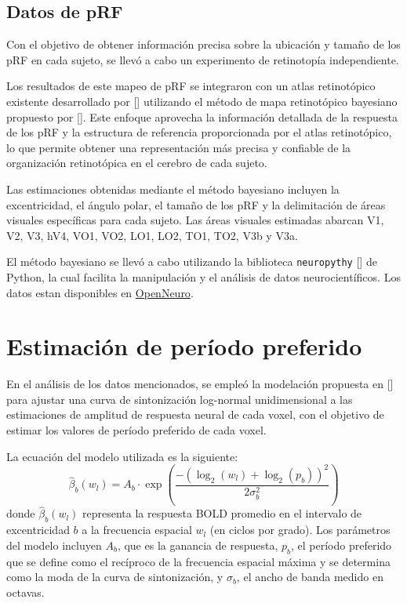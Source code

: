 \subsection{Datos de pRF}

Con el objetivo de obtener información precisa sobre la ubicación y tamaño de los pRF en cada sujeto, se llevó a cabo un experimento de retinotopía independiente. 

Los resultados de este mapeo de pRF se integraron con un atlas retinotópico existente desarrollado por [\cite{benson_retinotopic_2012}] utilizando el método de mapa retinotópico bayesiano propuesto por [\cite{benson_human_2018}]. Este enfoque aprovecha la información detallada de la respuesta de los pRF y la estructura de referencia proporcionada por el atlas retinotópico, lo que permite obtener una representación más precisa y confiable de la organización retinotópica en el cerebro de cada sujeto.

Las estimaciones obtenidas mediante el método bayesiano incluyen la excentricidad, el ángulo polar, el tamaño de los pRF y la delimitación de áreas visuales específicas para cada sujeto. Las áreas visuales estimadas abarcan V1, V2, V3, hV4, VO1, VO2, LO1, LO2, TO1, TO2, V3b y V3a.

El método bayesiano se llevó a cabo utilizando la biblioteca \texttt{neuropythy} [\cite{benson_human_2018}] de Python, la cual facilita la manipulación y el análisis de datos neurocientíficos. Los datos estan disponibles en \href{https://openneuro.org/datasets/ds003812/versions/1.1.0}{OpenNeuro}.


\section{Estimaci\'on de per\'iodo preferido}

En el análisis de los datos mencionados, se empleó la modelación propuesta en [\cite{broderick_mapping_2022}] para ajustar una curva de sintonización log-normal unidimensional a las estimaciones de amplitud de respuesta neural de cada voxel, con el objetivo de estimar los valores de período preferido de cada voxel.

La ecuación del modelo utilizada es la siguiente:
\begin{equation}
\hat{\beta}_b(w_l) = A_b \cdot \exp\left(\frac{-(\log_2(w_l) + \log_2(p_b))^2}{2\sigma_b^2}\right)
\end{equation}
donde \(\hat{\beta}_b(w_l)\) representa la respuesta BOLD promedio en el intervalo de excentricidad \(b\) a la frecuencia espacial \(w_l\) (en ciclos por grado). Los parámetros del modelo incluyen \(A_b\), que es la ganancia de respuesta, \(p_b\), el período preferido que se define como el recíproco de la frecuencia espacial máxima y se determina como la moda de la curva de sintonización, y \(\sigma_b\), el ancho de banda medido en octavas.

